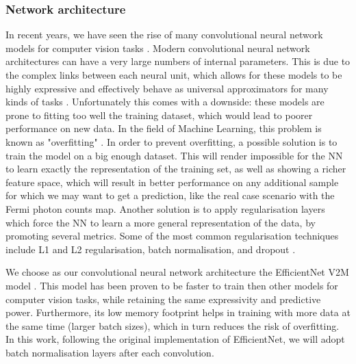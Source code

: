 \subsubsection{Network architecture}
In recent years, we have seen the rise of many convolutional neural network models for computer vision tasks \cite{CNNreview1,CNNreview2,CNNreview3}.
Modern convolutional neural network architectures can have a very large numbers of internal parameters. This is due to the complex links between each neural unit, which allows for these models to be highly expressive and effectively behave as universal approximators for many kinds of tasks \cite{HORNIK1989359}. Unfortunately this comes with a downside: these models are prone to fitting too well the training dataset, which would lead to poorer performance on new data. In the field of Machine Learning, this problem is known as "overfitting" \cite{overfitting}. In order to prevent overfitting, 
a possible solution is to train the model on a big enough dataset.
This will render impossible for the NN to learn exactly the representation of the training set, as well as showing a richer feature space, which will result in better performance on any additional sample for which we may want to get a prediction, like the real case scenario with the Fermi photon counts map. Another solution is to apply regularisation layers which force the NN to learn a more general representation of the data, by promoting several metrics. Some of the most common regularisation techniques include L1 and L2 regularisation, batch normalisation, and dropout \cite{dropout,batchnorm,regularisation1,regularisation2}.

We choose as our convolutional neural network architecture the EfficientNet V2M model \cite{efficient-net-v2}. This model has been proven to be faster to train then other models for computer vision tasks, while retaining the same expressivity and predictive power. 
Furthermore, its low memory footprint helps in training with more data at the same time (larger batch sizes), which in turn reduces the risk of overfitting.
In this work, following the original implementation of EfficientNet, we will adopt batch normalisation layers after each convolution.


